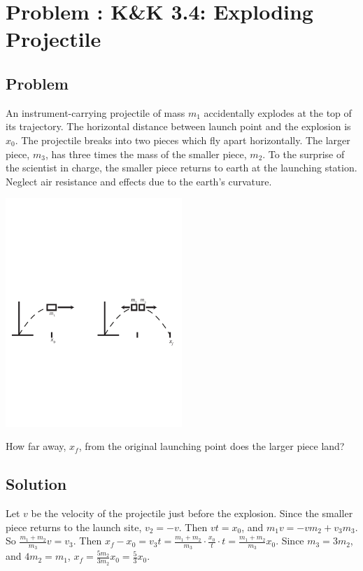 \documentclass[solutions]{esg8012pset}
\begin{document}
\section{Problem \thesection: K\&K 3.4: Exploding Projectile}
\subsection{Problem}
  An instrument-carrying projectile of mass $m_1$ accidentally explodes at the top of its trajectory. The horizontal distance between launch point and the explosion is $x_0$.  The projectile breaks into two pieces which fly apart horizontally. The larger piece, $m_3$, has three times the mass of the smaller piece, $m_2$. To the surprise of the scientist in charge, the smaller piece returns to earth at the launching station. Neglect air resistance and effects due to the earth's curvature.
  \begin{center}\includegraphics[width=0.5\textwidth]{ps_04_1}\end{center}
  How far away, $x_f$, from the original launching point does the larger piece land?
\subsection{Solution}
  Let $v$ be the velocity of the projectile just before the explosion.  Since the smaller piece returns to the launch site, $v_2 = -v$.  Then $v t = x_0$, and $m_1 v = -v m_2 + v_3 m_3$.  So $\frac{m_1+m_2}{m_3} v = v_3$.  Then $x_f - x_0 = v_3 t = \frac{m_1+m_2}{m_3}\cdot \frac{x_0}{t} \cdot t = \frac{m_1+m_2}{m_3}x_0$.  Since $m_3 = 3m_2$, and $4m_2 = m_1$, $x_f = \frac{5m_2}{3m_2}x_0 = \frac{5}{3}x_0$.
\end{document}
